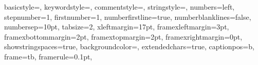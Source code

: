 \documentclass[12pt,apalike,a4paper,openright,oneside,makeidx]{memoir}
\begin{document}
\frontmatter






{
basicstyle={\footnotesize},
keywordstyle=\color[rgb]{0,0,1}, 
commentstyle=\color[rgb]{0.133,0.545,0.133}, 
stringstyle=\color[rgb]{0.627,0.126,0.941}, 
numbers=left, 
stepnumber=1, 
firstnumber=1,
numberfirstline=true,
numberblanklines=false, 
numbersep=10pt, 
tabsize=2,
xleftmargin=17pt,
framexleftmargin=3pt,
framexbottommargin=2pt,
framextopmargin=2pt,
framexrightmargin=0pt,
showstringspaces=true,
backgroundcolor={\color{ListingBackground}},
extendedchars=true,
captionpos=b,
frame=tb,
framerule=0.1pt, 
}







\mainmatter








%
%
%
%
% 
% 
% 
% 

\nocite{*}

{\small}

%

\backmatter

\end{document}
